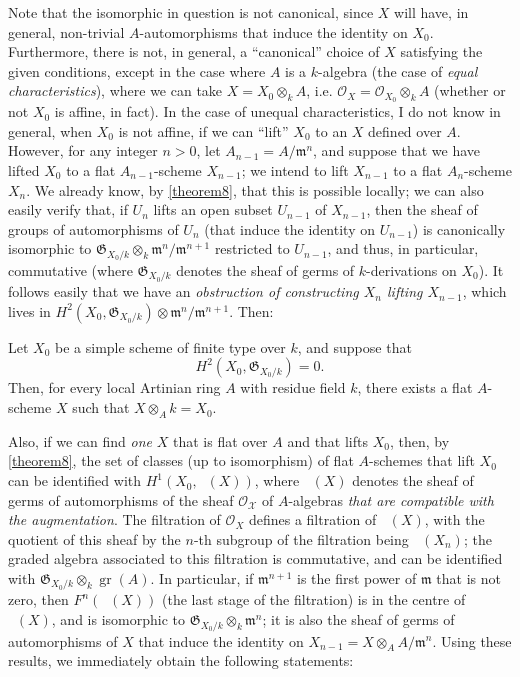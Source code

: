 \documentclass{article}
\theoremstyle{plain}
\newenvironment{corollary}[1]
  {\renewcommand\theinnercustomcorollary{#1}\innercustomcorollary}
  {\endinnercustomcorollary}
\theoremstyle{definition}
\newcommand{\sh}[1]{{\mathscr{#1}}}
\newcommand{\fk}{\mathfrak}
\DeclareMathOperator{\Aut}{Aut}
\DeclareMathOperator{\shAut}{\underline{\Aut}}
\DeclareMathOperator{\gr}{gr}
\newcommand{\oldpage}[1]{\marginpar{\footnotesize$\Big\vert$ \textit{p.~#1}}}
\begin{document}
Note that the isomorphic in question is not canonical, since $X$ will have, in general, non-trivial $A$-automorphisms that induce the identity on $X_0$.
Furthermore, there is not, in general, a ``canonical'' choice of $X$ satisfying the given conditions, except in the case where $A$ is a $k$-algebra (the case of \emph{equal characteristics}), where we can take $X=X_0\otimes_k A$, i.e. $\sh{O}_X=\sh{O}_{X_0}\otimes_k A$ (whether or not $X_0$ is affine, in fact).
In the case of unequal characteristics, I do not know in general, when $X_0$ is not affine, if we can ``lift'' $X_0$ to an $X$ defined over $A$.
However, for any integer $n>0$, let $A_{n-1}=A/\fk{m}^n$, and suppose that we have lifted $X_0$ to a flat $A_{n-1}$-scheme $X_{n-1}$;
we intend to lift $X_{n-1}$ to a flat $A_n$-scheme $X_n$.
We already know, by \cref{theorem8}, that this is possible locally;
we can also easily verify that, if $U_n$ lifts an open subset $U_{n-1}$ of $X_{n-1}$, then the sheaf of groups of automorphisms of $U_n$ (that induce the identity on $U_{n-1}$) is canonically isomorphic to $\fk{G}_{X_0/k}\otimes_k\fk{m}^n/\fk{m}^{n+1}$ restricted to $U_{n-1}$, and thus, in particular, commutative (where $\fk{G}_{X_0/k}$ denotes the sheaf of germs of $k$-derivations on $X_0$).
It follows easily that we have an \emph{obstruction of constructing $X_n$ lifting $X_{n-1}$}, which lives in $H^2(X_0,\fk{G}_{X_0/k})\otimes\fk{m}^n/\fk{m}^{n+1}$.
Then:

\begin{corollary}{1}
\label{theorem8corollary1}
  Let $X_0$ be a simple scheme of finite type over $k$, and suppose that
\oldpage{182-13}
  \[H^2(X_0,\fk{G}_{X_0/k})=0.\]
  Then, for every local Artinian ring $A$ with residue field $k$, there exists a flat $A$-scheme $X$ such that $X\otimes_A k=X_0$.
\end{corollary}

Also, if we can find \emph{one} $X$ that is flat over $A$ and that lifts $X_0$, then, by \cref{theorem8}, the set of classes (up to isomorphism) of flat $A$-schemes that lift $X_0$ can be identified with $H^1(X_0,\shAut(X))$, where $\shAut(X)$ denotes the sheaf of germs of automorphisms of the sheaf $\sh{O_X}$ of $A$-algebras \emph{that are compatible with the augmentation}.
The filtration of $\sh{O}_X$ defines a filtration of $\shAut(X)$, with the quotient of this sheaf by the $n$-th subgroup of the filtration being $\shAut(X_n)$;
the graded algebra associated to this filtration is commutative, and can be identified with $\fk{G}_{X_0/k}\otimes_k\gr(A)$.
In particular, if $\fk{m}^{n+1}$ is the first power of $\fk{m}$ that is not zero, then $F^n(\shAut(X))$ (the last stage of the filtration) is in the centre of $\shAut(X)$, and is isomorphic to $\fk{G}_{X_0/k}\otimes_k\fk{m}^n$;
it is also the sheaf of germs of automorphisms of $X$ that induce the identity on $X_{n-1}=X\otimes_A A/\fk{m}^n$.
Using these results, we immediately obtain the following statements:
\end{document}
